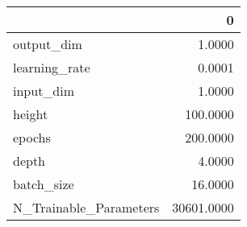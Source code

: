 \begin{tabular}{lr}
\toprule
{} &           0 \\
\midrule
output\_dim             &      1.0000 \\
learning\_rate          &      0.0001 \\
input\_dim              &      1.0000 \\
height                 &    100.0000 \\
epochs                 &    200.0000 \\
depth                  &      4.0000 \\
batch\_size             &     16.0000 \\
N\_Trainable\_Parameters &  30601.0000 \\
\bottomrule
\end{tabular}
